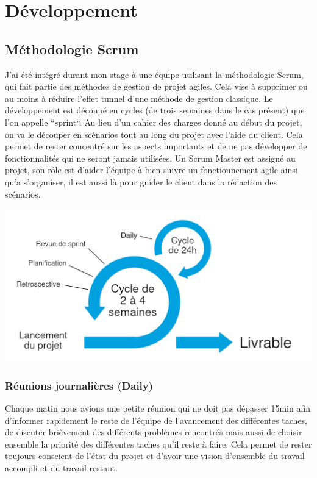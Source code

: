 \documentclass[12pt, a4paper]{report}
\begin{document}
    \chapter{Développement}
        \section{Méthodologie Scrum}
            J'ai été intégré durant mon stage à une équipe utilisant la méthodologie Scrum, qui fait partie des méthodes de gestion de projet agiles. Cela vise à supprimer ou au moins à réduire l'effet tunnel d'une méthode de gestion classique.\newline
            Le développement est découpé en cycles (de trois semaines dans le cas présent) que l'on appelle ``sprint``.\newline
            Au lieu d'un cahier des charges donné au début du projet, on va le découper en scénarios tout au long du projet avec l'aide du client.\newline
            Cela permet de rester concentré sur les aspects importants et de ne pas développer de fonctionnalités qui ne seront jamais utilisées.\newline
            Un Scrum Master est assigné au projet, son rôle est d'aider l'équipe à bien suivre un fonctionnement agile ainsi qu'a s'organiser, il est aussi là pour guider le client dans la rédaction des scénarios.
            \begin{center}
                \includegraphics[width=\textwidth]{scrum.jpg}
            \end{center}
            \subsection{Réunions journalières (Daily)}
                Chaque matin nous avions une petite réunion qui ne doit pas dépasser 15min afin d'informer rapidement le reste de l'équipe de l'avancement des différentes taches, de discuter brièvement des différents problèmes rencontrés mais aussi de choisir ensemble la priorité des différentes taches qu'il reste à faire.\newline
                Cela permet de rester toujours conscient de l'état du projet et d'avoir une vision d'ensemble du travail accompli et du travail restant.
\end{document}
